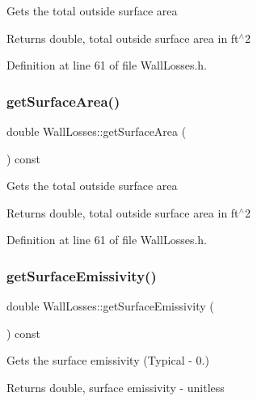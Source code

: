 Gets the total outside surface area \begin{DoxyReturn}{Returns}
double, total outside surface area in ft$^\wedge$2 
\end{DoxyReturn}


Definition at line 61 of file Wall\+Losses.\+h.

\mbox{\label{class_wall_losses_ad4d3aa549cc7ab19e927823dbafed973}} 
\subsubsection{\texorpdfstring{get\+Surface\+Area()}{getSurfaceArea()}\hspace{0.1cm}{\footnotesize\ttfamily [3/3]}}
{\footnotesize\ttfamily double Wall\+Losses\+::get\+Surface\+Area (\begin{DoxyParamCaption}{ }\end{DoxyParamCaption}) const\hspace{0.3cm}{\ttfamily [inline]}}

Gets the total outside surface area \begin{DoxyReturn}{Returns}
double, total outside surface area in ft$^\wedge$2 
\end{DoxyReturn}


Definition at line 61 of file Wall\+Losses.\+h.

\mbox{\label{class_wall_losses_ae1fce9523d14831ef6bc9b7823d5ea08}} 
\subsubsection{\texorpdfstring{get\+Surface\+Emissivity()}{getSurfaceEmissivity()}\hspace{0.1cm}{\footnotesize\ttfamily [1/3]}}
{\footnotesize\ttfamily double Wall\+Losses\+::get\+Surface\+Emissivity (\begin{DoxyParamCaption}{ }\end{DoxyParamCaption}) const\hspace{0.3cm}{\ttfamily [inline]}}

Gets the surface emissivity (Typical -\/ 0.) \begin{DoxyReturn}{Returns}
double, surface emissivity -\/ unitless 
\end{DoxyReturn}


